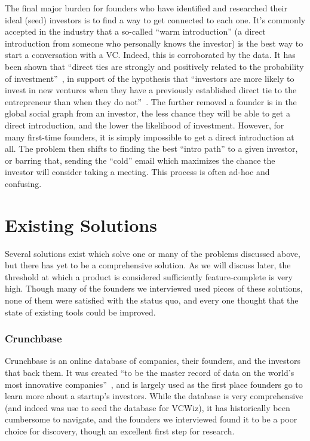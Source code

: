 The final major burden for founders who have identified and researched their ideal (seed) investors is to find a way to get connected to each one. It's commonly accepted in the industry that a so-called ``warm introduction'' (a direct introduction from someone who personally knows the investor) is the best way to start a conversation with a VC. Indeed, this is corroborated by the data. It has been shown that ``direct ties are strongly and positively related to the probability of investment''~\cite{doi:10.1287/mnsc.48.3.364.7731}, in support of the hypothesis that ``investors are more likely to invest in new ventures when they have a previously established direct tie to the entrepreneur than when they do not''~\cite{doi:10.1287/mnsc.48.3.364.7731}. The further removed a founder is in the global social graph from an investor, the less chance they will be able to get a direct introduction, and the lower the likelihood of investment. However, for many first-time founders, it is simply impossible to get a direct introduction at all. The problem then shifts to finding the best ``intro path'' to a given investor, or barring that, sending the ``cold'' email which maximizes the chance the investor will consider taking a meeting. This process is often ad-hoc and confusing.

\section{Existing Solutions}
\label{vcwiz:existing}

Several solutions exist which solve one or many of the problems discussed above, but there has yet to be a comprehensive solution. As we will discuss later, the threshold at which a product is considered sufficiently feature-complete is very high. Though many of the founders we interviewed used pieces of these solutions, none of them were satisfied with the status quo, and every one thought that the state of existing tools could be improved.

\subsubsection{Crunchbase}

Crunchbase is an online database of companies, their founders, and the investors that back them. It was created ``to be the master record of data on the world's most innovative companies''~\cite{doi:10.1287/mnsc.48.3.364.7731}, and is largely used as the first place founders go to learn more about a startup's investors. While the database is very comprehensive (and indeed was use to seed the database for VCWiz), it has historically been cumbersome to navigate, and the founders we interviewed found it to be a poor choice for discovery, though an excellent first step for research.

